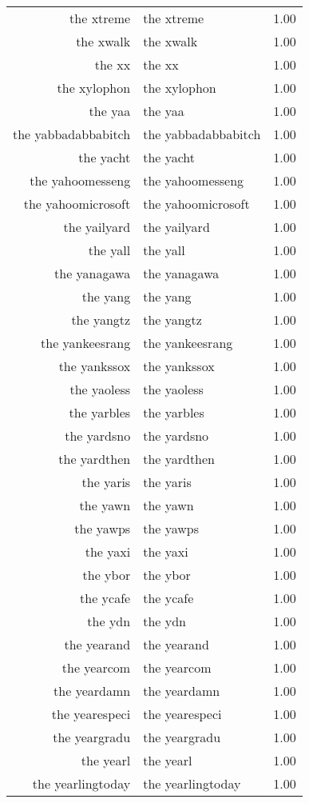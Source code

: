 \begin{table}[ht]
\begin{tabular}{rlr}
  the xtreme & the xtreme & 1.00 \\ 
  the xwalk & the xwalk & 1.00 \\ 
  the xx & the xx & 1.00 \\ 
  the xylophon & the xylophon & 1.00 \\ 
  the yaa & the yaa & 1.00 \\ 
  the yabbadabbabitch & the yabbadabbabitch & 1.00 \\ 
  the yacht & the yacht & 1.00 \\ 
  the yahoomesseng & the yahoomesseng & 1.00 \\ 
  the yahoomicrosoft & the yahoomicrosoft & 1.00 \\ 
  the yailyard & the yailyard & 1.00 \\ 
  the yall & the yall & 1.00 \\ 
  the yanagawa & the yanagawa & 1.00 \\ 
  the yang & the yang & 1.00 \\ 
  the yangtz & the yangtz & 1.00 \\ 
  the yankeesrang & the yankeesrang & 1.00 \\ 
  the yankssox & the yankssox & 1.00 \\ 
  the yaoless & the yaoless & 1.00 \\ 
  the yarbles & the yarbles & 1.00 \\ 
  the yardsno & the yardsno & 1.00 \\ 
  the yardthen & the yardthen & 1.00 \\ 
  the yaris & the yaris & 1.00 \\ 
  the yawn & the yawn & 1.00 \\ 
  the yawps & the yawps & 1.00 \\ 
  the yaxi & the yaxi & 1.00 \\ 
  the ybor & the ybor & 1.00 \\ 
  the ycafe & the ycafe & 1.00 \\ 
  the ydn & the ydn & 1.00 \\ 
  the yearand & the yearand & 1.00 \\ 
  the yearcom & the yearcom & 1.00 \\ 
  the yeardamn & the yeardamn & 1.00 \\ 
  the yearespeci & the yearespeci & 1.00 \\ 
  the yeargradu & the yeargradu & 1.00 \\ 
  the yearl & the yearl & 1.00 \\ 
  the yearlingtoday & the yearlingtoday & 1.00 \\ 

\end{tabular}
\end{table}

